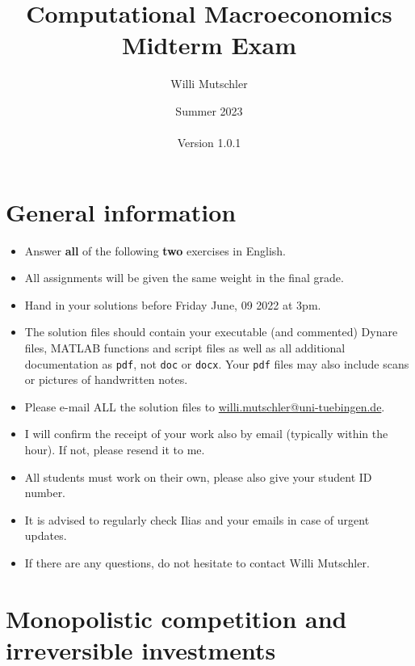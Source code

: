 \documentclass[a4paper]{scrartcl}
\begin{document}
	
\title{Computational Macroeconomics\\Midterm Exam}
\author{Willi Mutschler}
\date{Summer 2023\\~\\Version 1.0.1}
\maketitle

\section*{General information}

\begin{itemize}
\item
Answer \textbf{all} of the following \textbf{two} exercises in English.
\item
All assignments will be given the same weight in the final grade.
\item
Hand in your solutions before Friday June, 09 2022 at 3pm.
\item
The solution files should contain your executable (and commented) Dynare files, MATLAB functions and script files
  as well as all additional documentation as \texttt{pdf}, not \texttt{doc} or \texttt{docx}.
Your \texttt{pdf} files may also include scans or pictures of handwritten notes.
\item
Please e-mail ALL the solution files to \url{willi.mutschler@uni-tuebingen.de}.
\item
I will confirm the receipt of your work also by email (typically within the hour). If not, please resend it to me.
\item
All students must work on their own, please also give your student ID number.
\item
It is advised to regularly check Ilias and your emails in case of urgent updates.
\item
If there are any questions, do not hesitate to contact Willi Mutschler.
\end{itemize}


\newpage

\section[Monopolistic competition and irreversible investments]{Monopolistic competition and irreversible investments\label{ex:RBCModelMonCompIrrInvest}}
\end{document}
